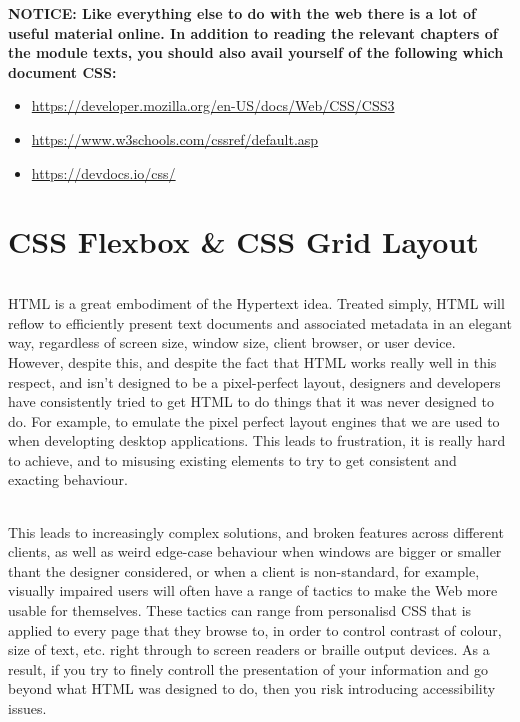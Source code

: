 \documentclass[10pt, a4paper, twosize]{article}
\begin{document}
\begin{framed}
{\bf{NOTICE:} Like everything else to do with the web there is a lot of useful material online. In addition to reading the relevant chapters of the module texts, you should also avail yourself of the following which document CSS:
\begin{itemize}
\item \url{https://developer.mozilla.org/en-US/docs/Web/CSS/CSS3}
\item \url{https://www.w3schools.com/cssref/default.asp}
\item \url{https://devdocs.io/css/}
\end{itemize}

}
\end{framed}

\part{CSS Flexbox \& CSS Grid Layout}
\paragraph{} HTML is a great embodiment of the Hypertext idea. Treated simply, HTML will reflow to efficiently present text documents and associated metadata in an elegant way, regardless of screen size, window size, client browser, or user device. However, despite this, and despite the fact that HTML works really well in this respect, and isn't designed to be a pixel-perfect layout, designers and developers have consistently tried to get HTML to do things that it was never designed to do. For example, to emulate the pixel perfect layout engines that we are used to when developting desktop applications. This leads to frustration, it is really hard to achieve, and to misusing existing elements to try to get consistent and exacting behaviour.

\paragraph{} This leads to increasingly complex solutions, and broken features across different clients, as well as weird edge-case behaviour when windows are bigger or smaller thant the designer considered, or when a client is non-standard, for example, visually impaired users will often have a range of tactics to make the Web more usable for themselves. These tactics can range from personalisd CSS that is applied to every page that they browse to, in order to control contrast of colour, size of text, etc. right through to screen readers or braille output devices. As a result, if you try to finely controll the presentation of your information and go beyond what HTML was designed to do, then you risk introducing accessibility issues.
\end{document}
